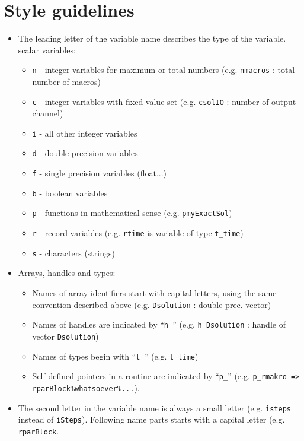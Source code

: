 \section{Style guidelines}


\begin{itemize}

\item The leading letter of the variable name describes the type of the variable. \\
scalar variables:
  \begin{itemize}
    \item {\tt n} - integer variables for maximum or total numbers (e.g. {\tt nmacros} : total 
number of macros)
    \item {\tt c} - integer variables with fixed value set (e.g. {\tt csolIO} : number of 
                    output channel)
    \item {\tt i} - all other integer variables
    \item {\tt d} - double precision variables
    \item {\tt f} - single precision variables (float...)
    \item {\tt b} - boolean variables
    \item {\tt p} - functions in mathematical sense (e.g. {\tt pmyExactSol})
    \item {\tt r} - record variables (e.g. {\tt rtime} is variable of type {\tt t\_time})
    \item {\tt s} - characters (strings)
  \end{itemize}
\item Arrays, handles and types:
  \begin{itemize}
    \item Names of array identifiers start with capital letters, using the same convention
    described above (e.g. {\tt Dsolution} : double prec. vector)  
    \item Names of handles are indicated by ``{\tt h\_}'' (e.g. {\tt h\_Dsolution} : handle of
    vector {\tt Dsolution})
    \item Names of types begin with ``{\tt t\_}'' (e.g. {\tt t\_time})
    \item Self-defined pointers in a routine are indicated by ``{\tt p\_}'' \newline (e.g.
    {\tt p\_rmakro => rparBlock\%whatsoever\%...}). 
\end{itemize}

\item The second letter in the variable name is always a small letter (e.g. {\tt isteps} 
instead of {\tt iSteps}). Following name parts starts with a capital letter (e.g. {\tt rparBlock}.


\end{itemize}
